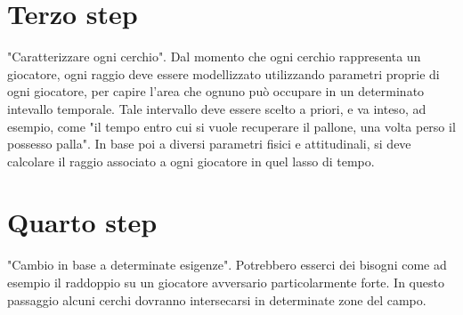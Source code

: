 \documentclass{report}
\begin{document}
\section{Terzo step}
"Caratterizzare ogni cerchio".\newline
\newline
Dal momento che ogni cerchio rappresenta un giocatore, ogni raggio deve essere modellizzato utilizzando parametri proprie di ogni giocatore, per capire l'area che ognuno può occupare in un determinato intevallo temporale.
Tale intervallo deve essere scelto a priori, e va inteso, ad esempio, come "il tempo entro cui si vuole recuperare il pallone, una volta perso il possesso palla". In base poi a diversi parametri fisici e attitudinali, si deve calcolare il raggio associato a ogni giocatore in quel lasso di tempo.


\section{Quarto step}
"Cambio in base a determinate esigenze".\newline
\newline
Potrebbero esserci dei bisogni come ad esempio il raddoppio su un giocatore avversario particolarmente forte. In questo passaggio alcuni cerchi dovranno intersecarsi in determinate zone del campo.
\end{document}
